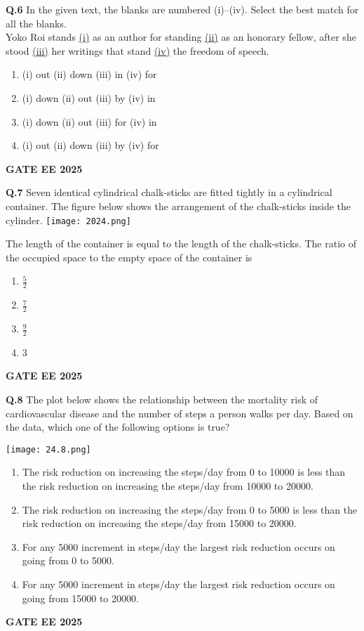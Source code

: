 \documentclass{article}
\begin{document}
\textbf{Q.6} In the given text, the blanks are numbered (i)–(iv). Select the best match for all the blanks. \\
Yoko Roi stands \underline{(i)} as an author for standing \underline{(ii)} as an honorary fellow, after she stood \underline{(iii)} her writings that stand \underline{(iv)} the freedom of speech.
\begin{enumerate}[label=(\Alph*)]
    \item (i) out (ii) down (iii) in (iv) for
    \item (i) down (ii) out (iii) by (iv) in
    \item (i) down (ii) out (iii) for (iv) in
    \item (i) out (ii) down (iii) by (iv) for
\end{enumerate}
\textbf{GATE EE 2025}

\vspace{0.5cm}

\textbf{Q.7} Seven identical cylindrical chalk-sticks are fitted tightly in a cylindrical container. The figure below shows the arrangement of the chalk-sticks inside the cylinder.
\texttt{[image: 2024.png]}

The length of the container is equal to the length of the chalk-sticks. The ratio of the occupied space to the empty space of the container is
\begin{enumerate}[label=(\Alph*)]
    \item $\frac{5}{2}$
    \item $\frac{7}{2}$
    \item $\frac{9}{2}$
    \item 3
\end{enumerate}
\textbf{GATE EE 2025}

\vspace{0.5cm}

\textbf{Q.8} The plot below shows the relationship between the mortality risk of cardiovascular disease and the number of steps a person walks per day. Based on the data, which one of the following options is true?

\texttt{[image: 24.8.png]}

\begin{enumerate}[label=(\Alph*)]
    \item The risk reduction on increasing the steps/day from 0 to 10000 is less than the risk reduction on increasing the steps/day from 10000 to 20000.
    \item The risk reduction on increasing the steps/day from 0 to 5000 is less than the risk reduction on increasing the steps/day from 15000 to 20000.
    \item For any 5000 increment in steps/day the largest risk reduction occurs on going from 0 to 5000.
    \item For any 5000 increment in steps/day the largest risk reduction occurs on going from 15000 to 20000.
\end{enumerate}
\textbf{GATE EE 2025}
\end{document}
